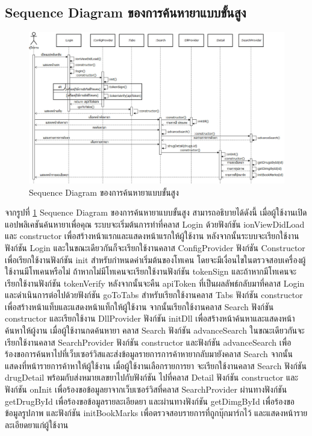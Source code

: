 	\subsection{Sequence Diagram ของการค้นหายาแบบขั้นสูง}

	\begin{figure}[H]
		\includegraphics[width=\columnwidth]
		{Figures/3/Sequence-2}
		\caption{Sequence Diagram ของการค้นหายาแบบขั้นสูง}
		\label{Fig:Sequence-2}
	\end{figure}
	
	จากรูปที่ \ref{Fig:Sequence-2} Sequence Diagram ของการค้นหายาแบบขั้นสูง สามารถอธิบายได้ดังนี้ เมื่อผู้ใช้งานเปิดแอปพลิเคชันค้นหายาเพื่อคุณ ระบบจะเริ่มต้นการทำที่คลาส Login ด้วยฟังก์ชัน ionViewDidLoad และ constructor เพื่อสร้างหน้าแรกและแสดงหน้าแรกให้ผู้ใช้งาน หลังจากนั้นระบบจะเรียกใช้งานฟังก์ชัน Login และในขณะเดียวกันก็จะเรียกใช้งานคลาส ConfigProvider ฟังก์ชัน Constructor เพื่อเรียกใช้งานฟังก์ชัน init สำหรับกำหนดค่าเริ่มต้นของโทเคน โดยจะมีเงื่อนไขในตรวจสอบเครื่องผู้ใช้งานมีโทเคนหรือไม่ ถ้าหากไม่มีโทเคนจะเรียกใช้งานฟังก์ชัน tokenSign และถ้าหากมีโทเคนจะเรียกใช้งานฟังก์ชัน tokenVerify หลังจากนั้นจะคืน apiToken ที่เป็นผลลัพธ์กลับมาที่คลาส Login และดำเนินการต่อไปด้วยฟังก์ชัน goToTabs สำหรับเรียกใช้งานคลาส Tabs ฟังก์ชัน constructor เพื่อสร้างหน้าแท็บและแสดงหน้าแท็กให้ผู้ใช้งาน จากนั้นเรียกใช้งานคลาส Search ฟังก์ชัน constructor และเรียกใช้งาน DllProvider ฟังก์ชัน initDll เพื่อสร้างหน้าค้นหาและแสดงหน้าค้นหาให้ผู้งาน เมื่อผู้ใช้งานกดค้นหายา คลาส Search ฟังก์ชัน advanceSearch ในขณะเดียวกันจะเรียกใช้งานคลาส SearchProvider ฟังก์ชัน constructor และฟังก์ชัน advanceSearch เพื่อร้องขอการค้นหาไปที่เว็บเซอร์วิสและส่งข้อมูลรายการการค้าหายากลับมายังคลาส Search จากนั้นแสดงที่หน้ารายการค้าหาให้ผู้ใช้งาน เมื่อผู้ใช้งานเลือกรายการยา จะเรียกใช้งานคลาส Search ฟังก์ชัน drugDetail พร้อมกับส่งหมายเลขยาไปกับฟังก์ชัน ไปที่คลาส Detail ฟังก์ชัน constructor และฟังก์ชัน onInit เพื่อร้องขอข้อมูลยาจากเว็บเซอร์วิสที่คลาส SearchProvider ผ่านทางฟังก์ชัน getDrugById เพื่อร้องขอข้อมูลรายละเอียดยา และผ่านทางฟังก์ชัน getDimgById เพื่อร้องขอข้อมูลรูปภาพ และฟังก์ชัน initBookMarks เพื่อตรวจสอบรายการที่ถูกบุ๊กมาร์กไว้ และแสดงหน้ารายละเอียดยาแก่ผู้ใช้งาน

